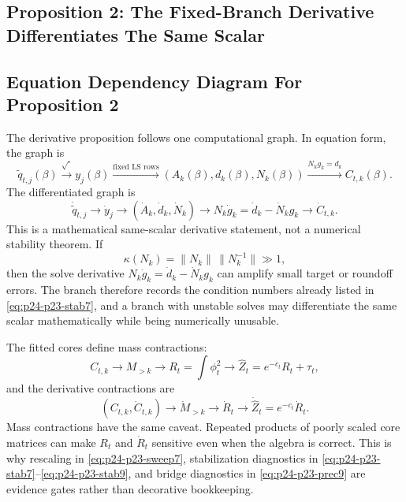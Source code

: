 \documentclass[11pt]{article}
\numberwithin{equation}{section}
\begin{document}
\subsection{Proposition 2: The Fixed-Branch Derivative Differentiates The Same Scalar}

\subsection*{Equation Dependency Diagram For Proposition 2}

The derivative proposition follows one computational graph.  In equation form,
the graph is
\begin{equation}
    \widetilde q_{t,j}(\beta)
    \xrightarrow{\sqrt{\cdot}}
    y_j(\beta)
    \xrightarrow{\text{fixed LS rows}}
    (A_k(\beta),d_k(\beta),N_k(\beta))
    \xrightarrow{N_kg_k=d_k}
    C_{t,k}(\beta).
    \label{eq:p24-p23-gdag1}
\end{equation}
The differentiated graph is
\begin{equation}
    \dot{\widetilde q}_{t,j}
    \to
    \dot y_j
    \to
    (\dot A_k,\dot d_k,\dot N_k)
    \to
    N_k\dot g_k=\dot d_k-\dot N_k g_k
    \to
    \dot C_{t,k}.
    \label{eq:p24-p23-gdag2}
\end{equation}
This is a mathematical same-scalar derivative statement, not a numerical
stability theorem.  If
\begin{equation}
    \kappa(N_k)
    =
    \|N_k\|\,\|N_k^{-1}\|
    \gg 1,
    \label{eq:p24-p23-gdag2a}
\end{equation}
then the solve derivative
\(N_k\dot g_k=\dot d_k-\dot N_kg_k\) can amplify small target or roundoff
errors.  The branch therefore records the condition numbers already listed in
\eqref{eq:p24-p23-stab7}, and a branch with unstable solves may differentiate the same
scalar mathematically while being numerically unusable.

The fitted cores define mass contractions:
\begin{equation}
    C_{t,k}
    \to
    M_{>k}
    \to
    R_t=\int\phi_t^2
    \to
    \widehat Z_t=e^{-c_t}R_t+\tau_t,
    \label{eq:p24-p23-gdag3}
\end{equation}
and the derivative contractions are
\begin{equation}
    (C_{t,k},\dot C_{t,k})
    \to
    \dot M_{>k}
    \to
    \dot R_t
    \to
    \dot{\widehat Z}_t=e^{-c_t}\dot R_t.
    \label{eq:p24-p23-gdag4}
\end{equation}
Mass contractions have the same caveat.  Repeated products of poorly scaled
core matrices can make \(R_t\) and \(\dot R_t\) sensitive even when the algebra
is correct.  This is why rescaling in \eqref{eq:p24-p23-sweep7}, stabilization diagnostics
in \eqref{eq:p24-p23-stab7}--\eqref{eq:p24-p23-stab9}, and bridge diagnostics in \eqref{eq:p24-p23-prec9} are
evidence gates rather than decorative bookkeeping.
\end{document}
